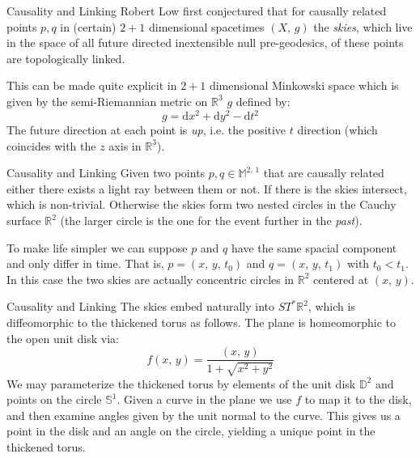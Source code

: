 \documentclass{beamer}
\begin{document}
    \begin{frame}{Causality and Linking}
        Robert Low first conjectured that for causally related points $p,q$ in
        (certain) $2+1$ dimensional spacetimes $(X,\,g)$ the \textit{skies},
        which live in the space of all future directed inextensible null
        pre-geodesics, of these points are topologically linked.
        \par\hfill\par
        This can be made quite explicit in $2+1$ dimensional Minkowski space
        which is given by the semi-Riemannian metric on $\mathbb{R}^{3}$ $g$
        defined by:
        \begin{equation}
            g=\textrm{d}x^{2}+\textrm{d}y^{2}-\textrm{d}t^{2}
        \end{equation}
        The future direction at each point is \textit{up}, i.e. the positive
        $t$ direction (which coincides with the $z$ axis in $\mathbb{R}^{3}$).
    \end{frame}
    \begin{frame}{Causality and Linking}
        Given two points $p,q\in\mathbb{M}^{2,\,1}$ that are causally related
        either there exists a light ray between them or not. If there is the
        skies intersect, which is non-trivial. Otherwise the skies form two
        nested circles in the Cauchy surface $\mathbb{R}^{2}$ (the larger
        circle is the one for the event further in the \textit{past}).
        \par\hfill\par
        To make life simpler we can suppose $p$ and $q$ have the same spacial
        component and only differ in time. That is, $p=(x,\,y,\,t_{0})$ and
        $q=(x,\,y,\,t_{1})$ with $t_{0}<t_{1}$. In this case the two skies are
        actually concentric circles in $\mathbb{R}^{2}$ centered at $(x,\,y)$.
    \end{frame}
    \begin{frame}{Causality and Linking}
        The skies embed naturally into $ST^{*}\mathbb{R}^{2}$, which is
        diffeomorphic to the thickened torus as follows. The plane is
        homeomorphic to the open unit disk via:
        \begin{equation}
            f(x,\,y)=\frac{(x,\,y)}{1+\sqrt{x^{2}+y^{2}}}
        \end{equation}
        We may parameterize the thickened torus by elements of the unit disk
        $\mathbb{D}^{2}$ and points on the circle $\mathbb{S}^{1}$. Given a
        curve in the plane we use $f$ to map it to the disk, and then examine
        angles given by the unit normal to the curve. This gives us a point in
        the disk and an angle on the circle, yielding a unique point in the
        thickened torus.
    \end{frame}
\end{document}
